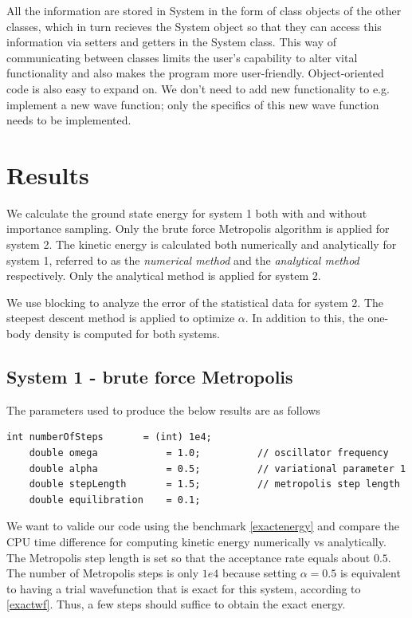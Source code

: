 \documentclass[english, a4paper]{article}
\begin{document}
\noindent All the information are stored in System in the form of class objects of the other classes, which in turn 
recieves the System object so that they can access this information via
setters and getters in the System class. This way of communicating between classes limits the user's 
capability to alter vital functionality and also makes the program more user-friendly. 
Object-oriented code is also easy to expand on. We don't need to add new functionality to
e.g. implement a new wave function; only the specifics of this new wave function needs to be implemented. 


\section{Results}



\noindent We calculate the ground state energy for system 1 both with and without importance sampling.
Only the brute force Metropolis algorithm is applied for system 2.
The kinetic energy is calculated both numerically and analytically for system 1, 
referred to as the \textit{numerical method} and the \textit{analytical method} respectively.
Only the analytical method is applied for system 2. 

\noindent We use blocking to analyze the error of the statistical data for system 2.
The steepest descent method is applied to optimize $\alpha$. 
In addition to this, the one-body density is computed for both systems.


\subsection{System 1 - brute force Metropolis}

The parameters used to produce the below results are as follows
\belowcaptionskip=-10pt
\begin{lstlisting}[label=parameters1,caption=Parameters brute force Metropolis system 1]
    int numberOfSteps       = (int) 1e4;
    double omega            = 1.0;          // oscillator frequency
    double alpha            = 0.5;          // variational parameter 1
    double stepLength       = 1.5;          // metropolis step length
    double equilibration    = 0.1;          
\end{lstlisting}

We want to valide our code using the benchmark \eqref{exactenergy} and
compare the CPU time difference for computing kinetic energy numerically vs analytically. 
The Metropolis step length is set so that the acceptance rate equals about $0.5$.
The number of Metropolis steps is only $1e4$ because setting $\alpha = 0.5$ is equivalent to
having a trial wavefunction that is exact for this system, according to \eqref{exactwf}. Thus, a few steps should suffice
to obtain the exact energy.
\end{document}
